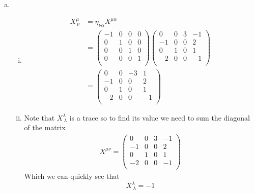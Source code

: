 \documentclass[11pt]{article}
\numberwithin{equation}{section}
\begin{document}
\begin{enumerate}[(a)]
\item
\begin{enumerate}[(i)]
\item
\begin{align*}
X^{\mu}_{\ \nu} &= \eta_{\nu\alpha}X^{\mu\alpha}\\
&= \left(\begin{array}{cccc}
	-1 &0 &0 &0\\
	0 &1 &0 &0\\
	0 &0 &1 &0\\
	0 &0 &0 &1\\
\end{array}\right)
\left(\begin{array}{cccc}
	0 &0 &3 &-1\\
	-1 &0 &0 &2\\
	0 &1 &0 &1\\
	-2 &0 &0 &-1\\
\end{array}\right)\\
&= \left(\begin{array}{cccc}
	0 &0 &-3 &1\\
	-1 &0 &0 &2\\
	0 &1 &0 &1\\
	-2 &0 &0 &-1\\
\end{array}\right)
\end{align*}

\item
Note that $X^{\lambda}_{\ \lambda}$ is a trace so to find its value we need to sum the diagonal of the matrix
\begin{align*}
		X^{\mu\nu} =	\left(\begin{array}{cccc}
				0 &0 &3 &-1\\
				-1 &0 &0 &2\\
				0 &1 &0 &1\\
				-2 &0 &0 &-1\\
			\end{array}\right)
\end{align*}
Which we can quickly see that
$$X^{\lambda}_{\ \lambda} = -1$$



\end{enumerate}
\end{enumerate}
\end{document}
